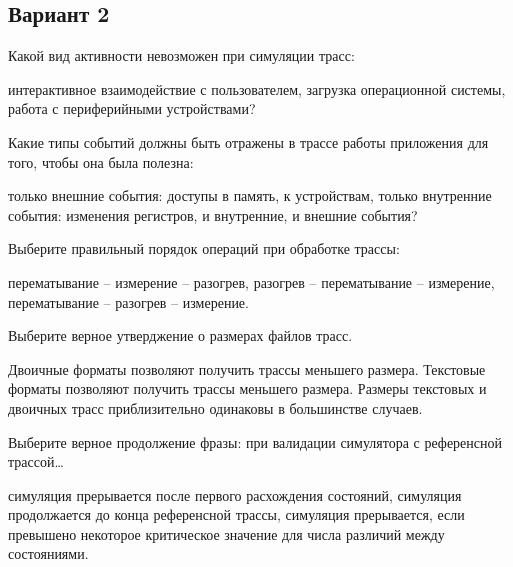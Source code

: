 \subsection*{Вариант 2}

\begin{questions}

\question[3] Какой вид активности невозможен при симуляции трасс:
\begin{choices}
\correctchoice интерактивное взаимодействие с пользователем,
\choice загрузка операционной системы,
\choice работа с периферийными устройствами?
\end{choices}

\question[3] Какие типы событий должны быть отражены в трассе работы приложения для того, чтобы она была полезна:
\begin{choices}
\correctchoice только внешние события: доступы в память, к устройствам,
\choice только внутренние события: изменения регистров,
\choice и внутренние, и внешние события?
\end{choices}

\question[3] Выберите правильный порядок операций при обработке трассы:
\begin{choices}
\choice перематывание -- измерение -- разогрев,
\choice разогрев -- перематывание  -- измерение,
\correctchoice перематывание -- разогрев -- измерение.
\end{choices}

\question[3] Выберите верное утверджение о размерах файлов трасс.
\begin{choices}
\correctchoice Двоичные форматы позволяют получить трассы меньшего размера.
\choice Текстовые форматы позволяют получить трассы меньшего размера.
\choice Размеры текстовых и двоичных трасс приблизительно одинаковы в большинстве случаев.
\end{choices}

\question[3] Выберите верное продолжение фразы: при валидации симулятора с референсной трассой{}\dots
\begin{choices}
\correctchoice симуляция прерывается после первого расхождения состояний,
\choice симуляция продолжается до конца референсной трассы,
\choice симуляция прерывается, если превышено некоторое критическое значение для числа различий между состояниями.
\end{choices}


\end{questions}


